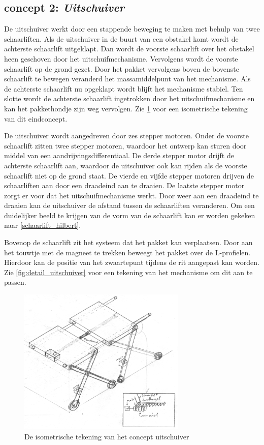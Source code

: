 \subsection{concept 2: \textit{Uitschuiver}}
\label{se:concept_2_uitschuiver}

De uitschuiver werkt door een stappende beweging te maken met behulp van twee schaarliften. Als de uitschuiver in de buurt van een obstakel komt wordt de achterste schaarlift uitgeklapt. Dan wordt de voorste schaarlift over het obstakel heen geschoven door het uitschuifmechanisme. Vervolgens wordt de voorste schaarlift op de grond gezet. Door het pakket vervolgens boven de bovenste schaarlift te bewegen veranderd het massamiddelpunt van het mechanisme. Als de achterste schaarlift nu opgeklapt wordt blijft het mechanisme stabiel. Ten slotte wordt de achterste schaarlift ingetrokken door het uitschuifmechanisme en kan het pakkethondje zijn weg vervolgen. Zie \cref{fig:isom_uitschuiver} voor een isometrische tekening van dit eindconcept.
\vspace{\baselineskip}

De uitschuiver wordt aangedreven door zes stepper motoren. Onder de voorste schaarlift zitten twee stepper motoren, waardoor het ontwerp kan sturen door middel van een aandrijvingsdifferentiaal. De derde stepper motor drijft de achterste schaarlift aan, waardoor de uitschuiver ook kan rijden als de voorste schaarlift niet op de grond staat. De vierde en vijfde stepper motoren drijven de schaarliften aan door een draadeind aan te draaien. De laatste stepper motor zorgt er voor dat het uitschuifmechanisme werkt. Door weer aan een draadeind te draaien kan de uitschuiver de afstand tussen de schaarliften veranderen. Om een duidelijker beeld te krijgen van de vorm van de schaarlift kan er worden gekeken naar \cref{schaarlift_hilbert}.

Bovenop de schaarlift zit het systeem dat het pakket kan verplaatsen. Door aan het touwtje met de magneet te trekken beweegt het pakket over de L-profielen. Hierdoor kan de positie van het zwaartepunt tijdens de rit aangepast kan worden. Zie \cref{fig:detail_uitschuiver} voor een tekening van het mechanisme om dit aan te passen. 


\begin{figure}[H]
    \centering
    \includegraphics[width=80mm]{04_idee_ontwikkeling/isom_uitschuiver.png}
    \caption{De isometrische tekening van het concept uitschuiver}
    \label{fig:isom_uitschuiver}
\end{figure}

